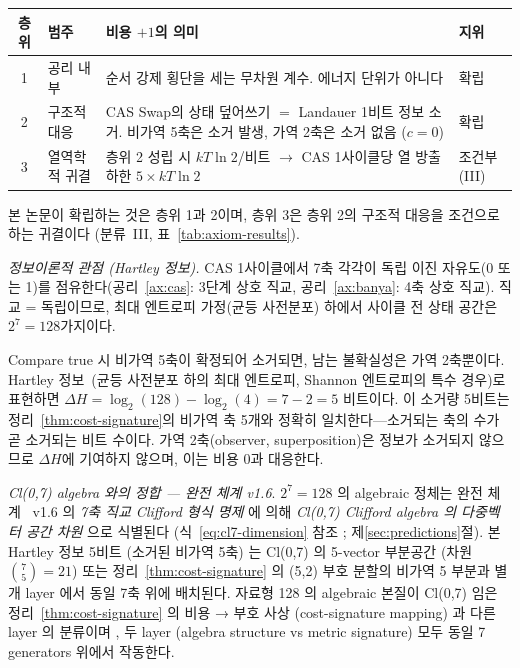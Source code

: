 \documentclass[entropy,article,submit,pdftex,oneauthor]{Definitions/mdpi}
\begin{document}
\begin{center}
\small
\begin{tabular}{clp{7.2cm}l}
\toprule
\textbf{층위} & \textbf{범주} & \textbf{비용 $+1$의 의미} & \textbf{지위} \\
\midrule
1 & 공리 내부 & 순서 강제 횡단을 세는 무차원 계수. 에너지 단위가 아니다 & 확립 \\
2 & 구조적 대응 & CAS Swap의 상태 덮어쓰기 $=$ Landauer 1비트 정보 소거. 비가역 5축은 소거 발생, 가역 2축은 소거 없음 ($c=0$) & 확립 \\
3 & 열역학적 귀결 & 층위 2 성립 시 $kT\ln 2$/비트 $\to$ CAS 1사이클당 열 방출 하한 $5 \times kT\ln 2$ & 조건부 (III) \\
\bottomrule
\end{tabular}
\end{center}

본 논문이 확립하는 것은 층위 1과 2이며, 층위 3은 층위 2의 구조적 대응을 조건으로 하는 귀결이다 (분류~III, 표~\ref{tab:axiom-results}).

\textit{정보이론적 관점 (Hartley 정보).} CAS 1사이클에서 7축 각각이 독립 이진 자유도(0 또는 1)를 점유한다(공리~\ref{ax:cas}: 3단계 상호 직교, 공리~\ref{ax:banya}: 4축 상호 직교). 직교 = 독립이므로, 최대 엔트로피 가정(균등 사전분포) 하에서 사이클 전 상태 공간은 $2^7 = 128$가지이다.

Compare true 시 비가역 5축이 확정되어 소거되면, 남는 불확실성은 가역 2축뿐이다. Hartley 정보~\cite{hartley1928}(균등 사전분포 하의 최대 엔트로피, Shannon 엔트로피의 특수 경우)로 표현하면 $\Delta H = \log_2(128) - \log_2(4) = 7 - 2 = 5$ 비트이다. 이 소거량 5비트는 정리~\ref{thm:cost-signature}의 비가역 축 5개와 정확히 일치한다---소거되는 축의 수가 곧 소거되는 비트 수이다. 가역 2축(observer, superposition)은 정보가 소거되지 않으므로 $\Delta H$에 기여하지 않으며, 이는 비용 $0$과 대응한다.

\emph{Cl(0,7) algebra 와의 정합 — 완전 체계 v1.6}. $2^7 = 128$ 의 algebraic 정체는 완전 체계~\cite{han2026} v1.6 의 \emph{7축 직교 Clifford 형식 명제} 에 의해 \emph{Cl(0,7) Clifford algebra 의 다중벡터 공간 차원} 으로 식별된다 (식~\eqref{eq:cl7-dimension} 참조 ; 제\ref{sec:predictions}절). 본 Hartley 정보 5비트 (소거된 비가역 5축) 는 Cl(0,7) 의 5-vector 부분공간 (차원 $\binom{7}{5} = 21$) 또는 정리~\ref{thm:cost-signature} 의 (5,2) 부호 분할의 비가역 5 부분과 별개 layer 에서 동일 7축 위에 배치된다. 자료형 128 의 algebraic 본질이 Cl(0,7) 임은 정리~\ref{thm:cost-signature} 의 비용 → 부호 사상 (cost-signature mapping) 과 다른 layer 의 분류이며 , 두 layer (algebra structure vs metric signature) 모두 동일 7 generators 위에서 작동한다.
\end{document}
